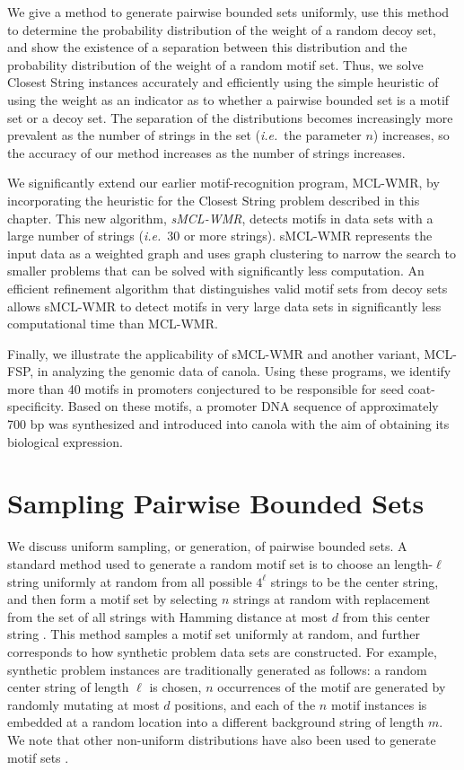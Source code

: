 We give a method to generate pairwise bounded sets uniformly, use this method to determine the probability distribution of the weight of a random decoy set, and show the existence of a separation between this distribution and the probability distribution of the weight of a random motif set.  Thus, we solve {\sc Closest String} instances accurately and efficiently using the simple heuristic of using the weight as an indicator as to whether a pairwise bounded set is a motif set or a decoy set.  The separation of the distributions becomes increasingly more prevalent as the number of strings in the set ({\em i.e.}\ the parameter $n$) increases, so the accuracy of our method increases as the number of strings increases.  

We significantly extend our earlier motif-recognition program, MCL-WMR, by incorporating the heuristic for the {\sc Closest String} problem described in this chapter. This new algorithm,  {\em sMCL-WMR}, detects motifs in data sets with a large number of strings ({\em i.e.}\ 30 or more strings).  sMCL-WMR represents the input data as a weighted graph and uses graph clustering to narrow the search to smaller problems that can be solved with significantly less computation.  An efficient refinement algorithm that distinguishes valid motif sets from decoy sets allows sMCL-WMR to detect motifs in very large data sets in significantly less computational time than MCL-WMR. 

Finally, we illustrate the applicability of sMCL-WMR and another variant, MCL-FSP, in analyzing the genomic data of canola.  Using these programs, we identify more than 40 motifs in promoters conjectured to be responsible for seed coat-specificity. Based on these motifs, a promoter DNA sequence of approximately 700 bp was synthesized and introduced into canola with the aim of obtaining its biological expression.

\section{Sampling Pairwise Bounded Sets} \label{sampling_sect}

We discuss uniform sampling, or generation, of pairwise bounded sets.  A standard method used to generate a random motif set is to choose an length-$\ell$ string uniformly at random from all possible $4^{\ell}$ strings to be the center string, and then form a motif set by selecting $n$ strings at random with replacement from the set of all strings with Hamming distance at most $d$ from this center string \cite{boucher07,BT02}.  This method samples a motif set uniformly at random, and further corresponds to how synthetic problem data sets are constructed.  For example, synthetic problem instances are traditionally generated as follows: a random center string of length $\ell$ is chosen, $n$ occurrences of the motif are generated by randomly mutating at most $d$ positions, and each of the $n$ motif instances is embedded at a random location into a different background string of length $m$.  We note that other non-uniform distributions have also been used to generate motif sets \cite{PS00}. 

